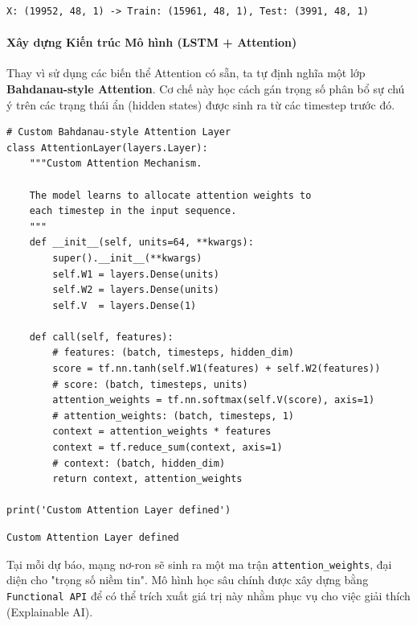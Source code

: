 \begin{lstlisting}[style=consoleoutput, caption={Output: Kích thước tập dữ liệu}]
X: (19952, 48, 1) -> Train: (15961, 48, 1), Test: (3991, 48, 1)
\end{lstlisting}

\paragraph{Xây dựng Kiến trúc Mô hình (LSTM + Attention)} \hfill\mbox{}

Thay vì sử dụng các biến thể Attention có sẵn, ta tự định nghĩa một lớp \textbf{Bahdanau-style Attention}. Cơ chế này học cách gán trọng số phân bổ sự chú ý trên các trạng thái ẩn (hidden states) được sinh ra từ các timestep trước đó.

\begin{lstlisting}[style=pythoncode, caption={Định nghĩa Lớp Attention tự xây dựng (Custom Layer)}]
# Custom Bahdanau-style Attention Layer
class AttentionLayer(layers.Layer):
    """Custom Attention Mechanism.
    
    The model learns to allocate attention weights to
    each timestep in the input sequence.
    """
    def __init__(self, units=64, **kwargs):
        super().__init__(**kwargs)
        self.W1 = layers.Dense(units)
        self.W2 = layers.Dense(units)
        self.V  = layers.Dense(1)

    def call(self, features):
        # features: (batch, timesteps, hidden_dim)
        score = tf.nn.tanh(self.W1(features) + self.W2(features))
        # score: (batch, timesteps, units)
        attention_weights = tf.nn.softmax(self.V(score), axis=1)
        # attention_weights: (batch, timesteps, 1)
        context = attention_weights * features
        context = tf.reduce_sum(context, axis=1)
        # context: (batch, hidden_dim)
        return context, attention_weights

print('Custom Attention Layer defined')
\end{lstlisting}

\begin{lstlisting}[style=consoleoutput, caption={Output: Khởi tạo Lớp Attention}]
Custom Attention Layer defined
\end{lstlisting}

Tại mỗi dự báo, mạng nơ-ron sẽ sinh ra một ma trận \texttt{attention\_weights}, đại diện cho "trọng số niềm tin". Mô hình học sâu chính được xây dựng bằng \texttt{Functional API} để có thể trích xuất giá trị này nhằm phục vụ cho việc giải thích (Explainable AI).

